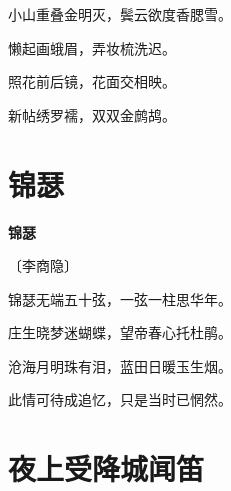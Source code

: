 \documentclass[12pt,UTF-8,openany,fontset=none]{ctexbook}
\begin{document}
    \vspace{18pt}  %

\begin{center}
    \begin{Large}

        小山重叠金明灭，鬓云欲度香腮雪。

        懒起画蛾眉，弄妆梳洗迟。

        照花前后镜，花面交相映。

        新帖绣罗襦，双双金鹧鸪。

    \end{Large}

\end{center}

\vspace{8pt}
\clearpage

\section{锦瑟}


\begin{center}
    {\bfseries 锦瑟}

    \vspace{18pt}

    \begin{large}\xuwen
        〔李商隐〕
    \end{large}

\end{center}

    \vspace{18pt}  %

\begin{center}
    \begin{Large}

        锦瑟无端五十弦，一弦一柱思华年。

        庄生晓梦迷蝴蝶，望帝春心托杜鹃。

        沧海月明珠有泪，蓝田日暖玉生烟。

        此情可待成追忆，只是当时已惘然。

    \end{Large}

\end{center}

\vspace{8pt}
\clearpage

\section{夜上受降城闻笛}
\end{document}
